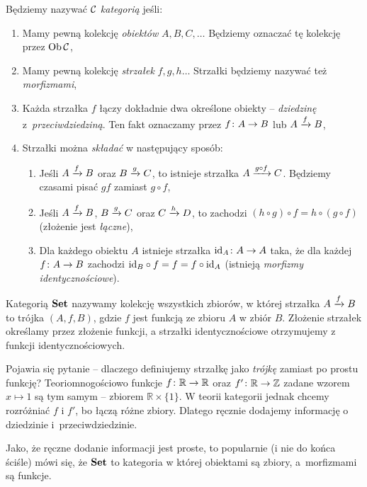 \begin{defn}
  Będziemy nazywać $\C$ \emph{kategorią} jeśli:
    \begin{enumerate}
      \item Mamy pewną kolekcję \emph{obiektów} $A, B, C, \dots$ Będziemy oznaczać tę kolekcję przez $\Ob \C$,
      \item Mamy pewną kolekcję \emph{strzałek} $f, g, h\dots$ Strzałki będziemy nazywać też \emph{morfizmami},
      \item Każda strzałka $f$ łączy dokładnie dwa określone obiekty -- \emph{dziedzinę} z~\emph{przeciwdziedziną}. Ten fakt oznaczamy przez $\morph fAB$ lub $\morpharr fAB$,
      \item Strzałki można \emph{składać} w następujący sposób:
        \begin{enumerate}
          \item Jeśli $\morpharr fAB$ oraz $\morpharr gBC$, to istnieje strzałka $\morpharr {g\circ f}AC$. Będziemy czasami pisać $gf$ zamiast $g\circ f$,
          \item Jeśli $\morpharr fAB$, $\morpharr gBC$ oraz $\morpharr h CD$, to zachodzi $(h\circ g)\circ f = h\circ (g\circ f)$ (złożenie jest \emph{łączne}),
          \item Dla każdego obiektu $A$ istnieje strzałka $\morph{\id A}AA$ taka, że dla każdej $\morph fAB$ zachodzi $\id B \circ f = f = f \circ \id A$ (istnieją \emph{morfizmy identycznościowe}).
        \end{enumerate}
    \end{enumerate}
\end{defn}

\begin{exmp}
  \label{exmp:set}
  Kategorią $\Set$ nazywamy kolekcję wszystkich zbiorów, w której strzałka $\morpharr fAB$ to trójka $(A, f, B)$, gdzie $f$ jest funkcją ze zbioru $A$ w zbiór $B$. Złożenie strzałek określamy przez złożenie funkcji, a strzałki identycznościowe otrzymujemy z funkcji identycznościowych.

  Pojawia się pytanie -- dlaczego definiujemy strzałkę jako \emph{trójkę} zamiast po prostu funkcję? Teoriomnogościowo funkcje $\morph f{\mathbb R}{\mathbb R}$ oraz $\morph {f'}{\mathbb R}{\mathbb Z}$ zadane wzorem $x\mapsto 1$ są tym samym -- zbiorem $\mathbb R\times \{1\}$. W teorii kategorii jednak chcemy rozróżniać $f$ i $f'$, bo łączą różne zbiory. Dlatego ręcznie dodajemy informację o dziedzinie i~przeciwdziedzinie.

  Jako, że ręczne dodanie informacji jest proste, to popularnie (i nie do końca ściśle) mówi się, że $\Set$ to kategoria w której obiektami są zbiory, a~morfizmami są funkcje.
\end{exmp}

